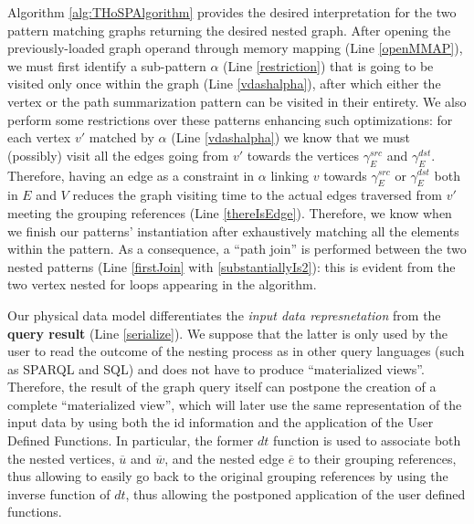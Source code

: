 Algorithm \ref{alg:THoSPAlgorithm} provides the desired interpretation for the two pattern matching graphs returning the desired nested graph. 
After opening the previously-loaded graph operand through memory mapping (Line \ref{openMMAP}), we must first identify a sub-pattern $\alpha$ (Line \ref{restriction}) that is going to be visited only once within the graph (Line \ref{vdashalpha}), after which either the vertex or the path summarization pattern can be visited in their entirety. We also perform some restrictions over these patterns enhancing such optimizations: for each vertex $v'$ matched by $\alpha$ (Line \ref{vdashalpha}) we know that we must (possibly) visit all the edges going from $v'$ towards the vertices $\gamma_E^{src}$ and $\gamma_E^{dst}$.  Therefore, having an edge as a constraint in $\alpha$ linking $v$ towards $\gamma_E^{src}$ or $\gamma_E^{dst}$ both in $E$ and $V$  reduces the graph visiting time to the actual edges traversed from $v'$ meeting the grouping references (Line \ref{thereIsEdge}). Therefore, we know when we finish  our patterns' instantiation after exhaustively matching all the elements within the pattern.
As a consequence, a ``path join'' is performed between the two nested patterns (Line \ref{firstJoin} with \ref{substantiallyIs2}): this is evident from the two vertex nested for loops appearing in the algorithm.  %



Our physical data model differentiates the \textit{input data  represnetation} from the \textbf{query result} (Line \ref{serialize}). 
We suppose that the latter is only used by the user to read the outcome of the nesting process as in other  query languages (such as SPARQL and SQL) and does not have to
produce ``materialized views''. Therefore, the result of the graph query itself can postpone the creation of a complete ``materialized view'', which will later use the same representation of the input data by using both the id information and the application of the User Defined Functions. In particular, the former $dt$ function is used to associate both the nested vertices, $\overline{u}$ and $\overline{w}$, and the nested edge $\overline{e}$ to their grouping references, thus allowing to easily go back to the original grouping references by using the inverse function of $dt$, thus allowing the postponed application of the user defined functions.


